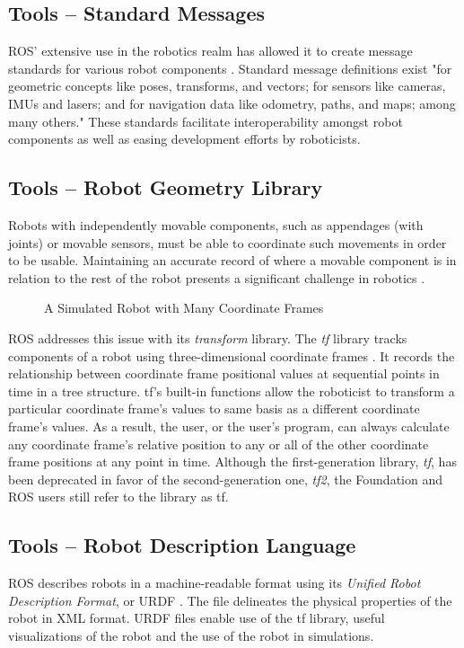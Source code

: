 \documentclass[9pt,twocolumn,twoside]{../../styles/osajnl}
\begin{document}
\subsection{Tools -- Standard Messages}
ROS' extensive use in the robotics realm has allowed it to create message standards for various robot components \cite{www-ros-core-components}.  Standard message definitions exist "for geometric concepts like poses, transforms, and vectors; for sensors like cameras, IMUs and lasers; and for navigation data like odometry, paths, and maps; among many others."  These standards facilitate interoperability amongst robot components as well as easing development efforts by roboticists. 

\subsection{Tools -- Robot Geometry Library}
Robots with independently movable components, such as appendages (with joints) or movable sensors, must be able to coordinate such movements in order to be usable.  Maintaining an accurate record of where a movable component is in relation to the rest of the robot presents a significant challenge in robotics \cite{www-ros-core-components}. 

\begin{figure}[htbp]
\centering
{}
\caption{A Simulated Robot with Many Coordinate Frames \cite{www-ros-robot-geometry}}
\label{fig:robotgeometry}
\end{figure}

ROS addresses this issue with its \textit{transform} library.  The \textit{tf} library tracks components of a robot using three-dimensional coordinate frames \cite{www-ros-robot-geometry}.  It records the relationship between coordinate frame positional values at sequential points in time in a tree structure.  tf's built-in functions allow the roboticist to transform a particular coordinate frame's values to same basis as a different coordinate frame's values.  As a result, the user, or the user's program, can always calculate any coordinate frame's relative position to any or all of the other coordinate frame positions at any point in time.  Although the first-generation library, \textit{tf}, has been deprecated in favor of the second-generation one, \textit{tf2}, the Foundation and ROS users still refer to the library as tf.

\subsection{Tools -- Robot Description Language}
ROS describes robots in a machine-readable format using its \textit{Unified Robot Description Format}, or URDF \cite{www-ros-core-components}.  The file delineates the physical properties of the robot in XML format.  URDF files enable use of the tf library, useful visualizations of the robot and the use of the robot in simulations.  
\end{document}

